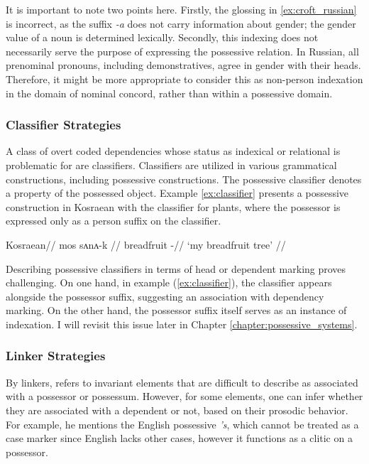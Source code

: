 It is important to note two points here. Firstly, the glossing in \ref{ex:croft_russian} is incorrect, as the suffix \textit{-a} does not carry information about gender; the gender value of a noun is determined lexically. Secondly, this indexing does not necessarily serve the purpose of expressing the possessive relation. In Russian, all prenominal pronouns, including demonstratives, agree in gender with their heads. Therefore, it might be more appropriate to consider this as non-person indexation in the domain of nominal concord, rather than within a possessive domain.

\subsubsection{Classifier Strategies}

A class of overt coded dependencies whose status as indexical or relational is problematic for \cite{croft2002typology} are classifiers. Classifiers are utilized in various grammatical constructions, including possessive constructions. The possessive classifier denotes a property of the possessed object. Example \ref{ex:classifier} presents a possessive construction in Kosraean with the classifier for plants, where the possessor is expressed only as a person suffix on the classifier.

\ex\label{ex:classifier}
\begingl
\glpreamble Kosraean//
\gla mos sʌnʌ-k //
\glb breadfruit \Clfplant-\Fsg //
\glft `my breadfruit tree' //
\endgl
\xe

Describing possessive classifiers in terms of head or dependent marking proves challenging. On one hand, in example (\ref{ex:classifier}), the classifier appears alongside the possessor suffix, suggesting an association with dependency marking. On the other hand, the possessor suffix itself serves as an instance of indexation. I will revisit this issue later in Chapter \ref{chapter:possessive_systems}.


\subsubsection{Linker Strategies}

By linkers, \cite{croft2002typology} refers to invariant elements that are difficult to describe as associated with a possessor or possessum. However, for some elements, one can infer whether they are associated with a dependent or not, based on their prosodic behavior. For example, he mentions the English possessive \textit{'s}, which cannot be treated as a case marker since English lacks other cases, however it functions as a clitic on a possessor.

